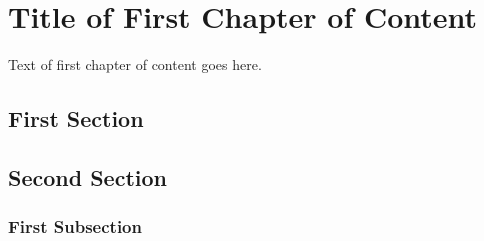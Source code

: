 \chapter{Title of First Chapter of Content}
\label{chap:one}

Text of first chapter of content goes here.

\section{First Section}

\section{Second Section}

\subsection{First Subsection}

